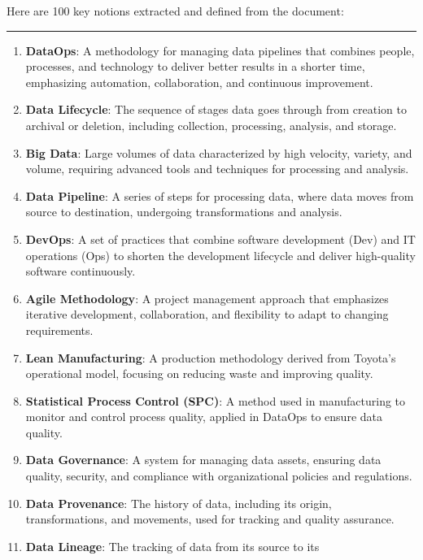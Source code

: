 \documentclass[
  letterpaper,
  DIV=11,
  numbers=noendperiod]{scrartcl}
\author{}
\date{}
\begin{document}
Here are 100 key notions extracted and defined from the document:

\begin{center}\rule{0.5\linewidth}{0.5pt}\end{center}

\begin{enumerate}
\def\labelenumi{\arabic{enumi}.}
\item
  \textbf{DataOps}: A methodology for managing data pipelines that
  combines people, processes, and technology to deliver better results
  in a shorter time, emphasizing automation, collaboration, and
  continuous improvement.
\item
  \textbf{Data Lifecycle}: The sequence of stages data goes through from
  creation to archival or deletion, including collection, processing,
  analysis, and storage.
\item
  \textbf{Big Data}: Large volumes of data characterized by high
  velocity, variety, and volume, requiring advanced tools and techniques
  for processing and analysis.
\item
  \textbf{Data Pipeline}: A series of steps for processing data, where
  data moves from source to destination, undergoing transformations and
  analysis.
\item
  \textbf{DevOps}: A set of practices that combine software development
  (Dev) and IT operations (Ops) to shorten the development lifecycle and
  deliver high-quality software continuously.
\item
  \textbf{Agile Methodology}: A project management approach that
  emphasizes iterative development, collaboration, and flexibility to
  adapt to changing requirements.
\item
  \textbf{Lean Manufacturing}: A production methodology derived from
  Toyota's operational model, focusing on reducing waste and improving
  quality.
\item
  \textbf{Statistical Process Control (SPC)}: A method used in
  manufacturing to monitor and control process quality, applied in
  DataOps to ensure data quality.
\item
  \textbf{Data Governance}: A system for managing data assets, ensuring
  data quality, security, and compliance with organizational policies
  and regulations.
\item
  \textbf{Data Provenance}: The history of data, including its origin,
  transformations, and movements, used for tracking and quality
  assurance.
\item
  \textbf{Data Lineage}: The tracking of data from its source to its

\end{enumerate}
\end{document}
